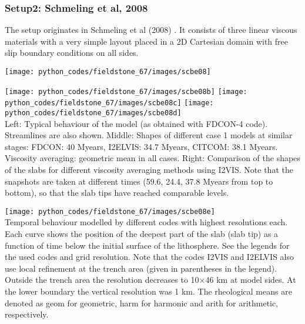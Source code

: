 \subsubsection*{Setup2: Schmeling et al, 2008}

The setup originates in Schmeling et al (2008) \cite{scbe08}. It consists of three linear viscous
materials with a very simple layout placed in a 2D Cartesian domain with free slip boundary conditions 
on all sides. 

\begin{center}
\texttt{[image: python\_codes/fieldstone\_67/images/scbe08]}
\end{center}

\begin{center}
\texttt{[image: python\_codes/fieldstone\_67/images/scbe08b]}
\texttt{[image: python\_codes/fieldstone\_67/images/scbe08c]}
\texttt{[image: python\_codes/fieldstone\_67/images/scbe08d]}\\
{\captionfont Left: Typical behaviour of the model (as obtained with FDCON-4 code). 
Streamlines are also shown.
Middle: Shapes of different case 1 models at similar stages: FDCON: 40 Myears,
I2ELVIS: 34.7 Myears, CITCOM: 38.1 Myears. Viscosity averaging: geometric mean
in all cases.
Right: Comparison of the shapes of the slabs for different viscosity averaging methods 
using I2VIS. Note that the snapshots are taken at different times (59.6, 24.4,
37.8 Myears from top to bottom), so that the slab tips have reached comparable
levels.}
\end{center}

\begin{center}
\texttt{[image: python\_codes/fieldstone\_67/images/scbe08e]}\\
{\captionfont 
Temporal behaviour modelled by different codes with highest resolutions each. 
Each curve shows the position of the deepest part of the slab (slab tip) as
a function of time below the initial surface of the lithosphere. 
See the legends for the used codes and grid resolution. 
Note that the codes I2VIS and I2ELVIS also use local
refinement at the trench area (given in parentheses in the legend). 
Outside the trench area the resolution decreases to 10$\times$46 km at model sides. 
At the lower boundary the vertical resolution was 1 km. 
The rheological means are denoted as geom for geometric, harm for harmonic 
and arith for arithmetic, respectively. }
\end{center}


